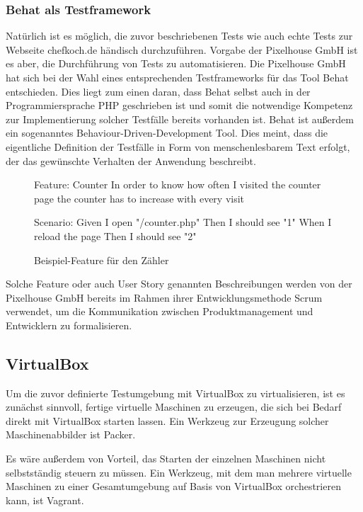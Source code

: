 \subsubsection{Behat als Testframework}

Natürlich ist es möglich, die zuvor beschriebenen Tests wie auch echte Tests zur Webseite chefkoch.de händisch durchzuführen. Vorgabe der Pixelhouse GmbH ist es aber, die Durchführung von Tests zu automatisieren. Die Pixelhouse GmbH hat sich bei der Wahl eines entsprechenden Testframeworks für das Tool Behat entschieden. Dies liegt zum einen daran, dass Behat selbst auch in der Programmiersprache PHP geschrieben ist und somit die notwendige Kompetenz zur Implementierung solcher Testfälle bereits vorhanden ist. Behat ist außerdem ein sogenanntes Behaviour-Driven-Development Tool. Dies meint, dass die eigentliche Definition der Testfälle in Form von menschenlesbarem Text erfolgt, der das gewünschte Verhalten der Anwendung beschreibt.

\begin{figure}[!ht]
  \begin{center}
    \begin{gherkincode}
Feature: Counter
  In order to know how often I visited the counter page
  the counter has to increase with every visit

  Scenario:
    Given I open "/counter.php"
    Then I should see "1"
    When I reload the page
    Then I should see "2"

    \end{gherkincode}
    \caption{Beispiel-Feature für den Zähler}
  \end{center}
\end{figure}

Solche Feature oder auch User Story genannten Beschreibungen werden von der Pixelhouse GmbH bereits im Rahmen ihrer Entwicklungsmethode Scrum verwendet, um die Kommunikation zwischen Produktmanagement und Entwicklern zu formalisieren.

\subsection{VirtualBox}

Um die zuvor definierte Testumgebung mit VirtualBox zu virtualisieren, ist es zunächst sinnvoll, fertige virtuelle Maschinen zu erzeugen, die sich bei Bedarf direkt mit VirtualBox starten lassen. Ein Werkzeug zur Erzeugung solcher Maschinenabbilder ist Packer.

Es wäre außerdem von Vorteil, das Starten der einzelnen Maschinen nicht selbstständig steuern zu müssen. Ein Werkzeug, mit dem man mehrere virtuelle Maschinen zu einer Gesamtumgebung auf Basis von VirtualBox orchestrieren kann, ist Vagrant.

